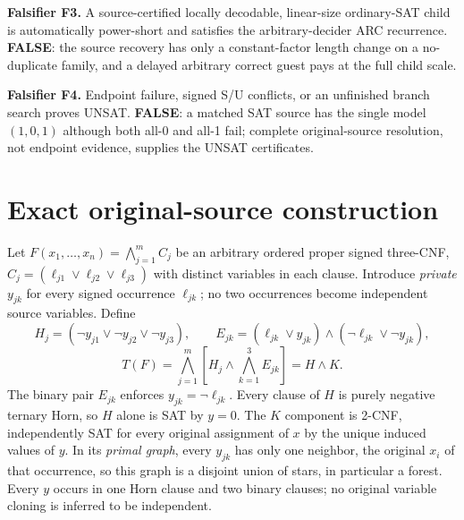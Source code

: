 \documentclass[11pt]{article}
\begin{document}
\noindent\textbf{Falsifier F3.} A source-certified locally decodable, linear-size ordinary-SAT child is automatically power-short and satisfies the arbitrary-decider ARC recurrence. \textbf{FALSE}: the source recovery has only a constant-factor length change on a no-duplicate family, and a delayed arbitrary correct guest pays at the full child scale.

\noindent\textbf{Falsifier F4.} Endpoint failure, signed S/U conflicts, or an unfinished branch search proves UNSAT. \textbf{FALSE}: a matched SAT source has the single model $(1,0,1)$ although both all-0 and all-1 fail; complete original-source resolution, not endpoint evidence, supplies the UNSAT certificates.

\section{Exact original-source construction}
Let $F(x_1,\ldots,x_n)=\bigwedge_{j=1}^{m}C_j$ be an arbitrary ordered proper signed three-CNF, $C_j=(\ell_{j1}\vee\ell_{j2}\vee\ell_{j3})$ with distinct variables in each clause. Introduce \emph{private} $y_{jk}$ for every signed occurrence $\ell_{jk}$; no two occurrences become independent source variables. Define
\[
 H_j=(\neg y_{j1}\vee\neg y_{j2}\vee\neg y_{j3}),\qquad
 E_{jk}=(\ell_{jk}\vee y_{jk})\wedge(\neg\ell_{jk}\vee\neg y_{jk}),
\]
\[
 T(F)=\bigwedge_{j=1}^m \left[H_j\wedge\bigwedge_{k=1}^3E_{jk}\right]=H\wedge K.
\]
The binary pair $E_{jk}$ enforces $y_{jk}=\neg\ell_{jk}$. Every clause of $H$ is purely negative ternary Horn, so $H$ alone is SAT by $y=0$. The $K$ component is 2-CNF, independently SAT for every original assignment of $x$ by the unique induced values of $y$. In its \emph{primal graph}, every $y_{jk}$ has only one neighbor, the original $x_i$ of that occurrence, so this graph is a disjoint union of stars, in particular a forest. Every $y$ occurs in one Horn clause and two binary clauses; no original variable cloning is inferred to be independent.
\end{document}
